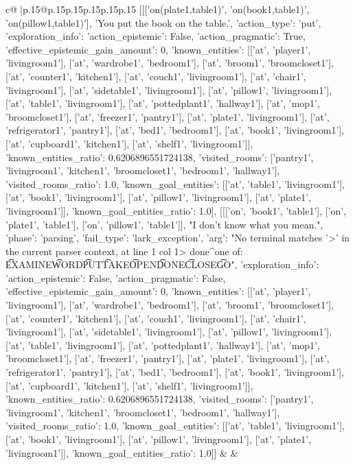 \documentclass{article}
\begin{document}
{\begin{supertabular}{c@{$\;$}|p{.15\linewidth}@{}p{.15\linewidth}p{.15\linewidth}p{.15\linewidth}p{.15\linewidth}p{.15\linewidth}}
{{{	 [[['on(plate1,table1)', 'on(book1,table1)', 'on(pillow1,table1)'], 'You put the book on the table.', {'action_type': 'put', 'exploration_info': {'action_epistemic': False, 'action_pragmatic': True, 'effective_epistemic_gain_amount': 0, 'known_entities': [['at', 'player1', 'livingroom1'], ['at', 'wardrobe1', 'bedroom1'], ['at', 'broom1', 'broomcloset1'], ['at', 'counter1', 'kitchen1'], ['at', 'couch1', 'livingroom1'], ['at', 'chair1', 'livingroom1'], ['at', 'sidetable1', 'livingroom1'], ['at', 'pillow1', 'livingroom1'], ['at', 'table1', 'livingroom1'], ['at', 'pottedplant1', 'hallway1'], ['at', 'mop1', 'broomcloset1'], ['at', 'freezer1', 'pantry1'], ['at', 'plate1', 'livingroom1'], ['at', 'refrigerator1', 'pantry1'], ['at', 'bed1', 'bedroom1'], ['at', 'book1', 'livingroom1'], ['at', 'cupboard1', 'kitchen1'], ['at', 'shelf1', 'livingroom1']], 'known_entities_ratio': 0.6206896551724138, 'visited_rooms': ['pantry1', 'livingroom1', 'kitchen1', 'broomcloset1', 'bedroom1', 'hallway1'], 'visited_rooms_ratio': 1.0, 'known_goal_entities': [['at', 'table1', 'livingroom1'], ['at', 'book1', 'livingroom1'], ['at', 'pillow1', 'livingroom1'], ['at', 'plate1', 'livingroom1']], 'known_goal_entities_ratio': 1.0}}], [[['on', 'book1', 'table1'], ['on', 'plate1', 'table1'], ['on', 'pillow1', 'table1']], "I don't know what you mean.", {'phase': 'parsing', 'fail_type': 'lark_exception', 'arg': "No terminal matches '>' in the current parser context, at line 1 col 1\n\n> done\n^\nExpected one of: \n\t* EXAMINE\n\t* WORD\n\t* PUT\n\t* TAKE\n\t* OPEN\n\t* DONE\n\t* CLOSE\n\t* GO\n", 'exploration_info': {'action_epistemic': False, 'action_pragmatic': False, 'effective_epistemic_gain_amount': 0, 'known_entities': [['at', 'player1', 'livingroom1'], ['at', 'wardrobe1', 'bedroom1'], ['at', 'broom1', 'broomcloset1'], ['at', 'counter1', 'kitchen1'], ['at', 'couch1', 'livingroom1'], ['at', 'chair1', 'livingroom1'], ['at', 'sidetable1', 'livingroom1'], ['at', 'pillow1', 'livingroom1'], ['at', 'table1', 'livingroom1'], ['at', 'pottedplant1', 'hallway1'], ['at', 'mop1', 'broomcloset1'], ['at', 'freezer1', 'pantry1'], ['at', 'plate1', 'livingroom1'], ['at', 'refrigerator1', 'pantry1'], ['at', 'bed1', 'bedroom1'], ['at', 'book1', 'livingroom1'], ['at', 'cupboard1', 'kitchen1'], ['at', 'shelf1', 'livingroom1']], 'known_entities_ratio': 0.6206896551724138, 'visited_rooms': ['pantry1', 'livingroom1', 'kitchen1', 'broomcloset1', 'bedroom1', 'hallway1'], 'visited_rooms_ratio': 1.0, 'known_goal_entities': [['at', 'table1', 'livingroom1'], ['at', 'book1', 'livingroom1'], ['at', 'pillow1', 'livingroom1'], ['at', 'plate1', 'livingroom1']], 'known_goal_entities_ratio': 1.0}}]] 
	  } 
	   } 
	   } 
	 & & \\ 
 


\end{supertabular}}
\end{document}

